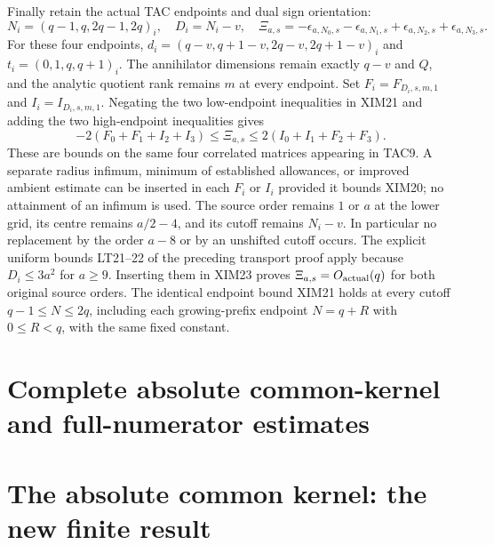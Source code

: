 Finally retain the actual TAC endpoints and dual sign orientation:
\[
 N_i=(q-1,q,2q-1,2q)_i,\quad D_i=N_i-v,\quad
 \Xi_{a,s}=-\epsilon_{a,N_0,s}-\epsilon_{a,N_1,s}
             +\epsilon_{a,N_2,s}+\epsilon_{a,N_3,s}.
 \tag{XIM22}
\]
For these four endpoints,
$d_i=(q-v,q+1-v,2q-v,2q+1-v)_i$ and
$t_i=(0,1,q,q+1)_i$. The annihilator dimensions remain exactly
$q-v$ and $Q$, and the analytic quotient rank remains $m$ at every
endpoint. Set $F_i=F_{D_i,s,m,1}$ and $I_i=I_{D_i,s,m,1}$.
Negating the two low-endpoint inequalities in XIM21 and adding the
two high-endpoint inequalities gives
\[
 \boxed{
 -2(F_0+F_1+I_2+I_3)
       \le\Xi_{a,s}\le
  2(I_0+I_1+F_2+F_3).}
 \tag{XIM23}
\]
These are bounds on the same four correlated matrices appearing in
TAC9. A separate radius infimum, minimum of established allowances,
or improved ambient estimate can be inserted in each $F_i$ or $I_i$
provided it bounds XIM20; no attainment of an infimum is used.
The source order remains $1$ or $a$ at the lower grid, its centre
remains $a/2-4$, and its cutoff remains $N_i-v$. In particular no
replacement by the order $a-8$ or by an unshifted cutoff occurs.
The explicit uniform bounds LT21--22 of the preceding transport proof
apply because $D_i\le3a^2$ for $a\ge9$. Inserting them in XIM23
proves $\Xi_{a,s}=O_{\rm actual}(q)$ for both original source orders.
The identical endpoint bound XIM21 holds at every cutoff
$q-1\le N\le2q$, including each growing-prefix endpoint $N=q+R$
with $0\le R<q$, with the same fixed constant.
\endgroup

\endgroup

\clearpage
\begingroup


\setcounter{equation}{0}
\renewcommand{\theequation}{AKS.\arabic{equation}}
\section*{Complete absolute common-kernel and full-numerator estimates}
\section{The absolute common kernel: the new finite result}
\label{aks:sec:AKS}

